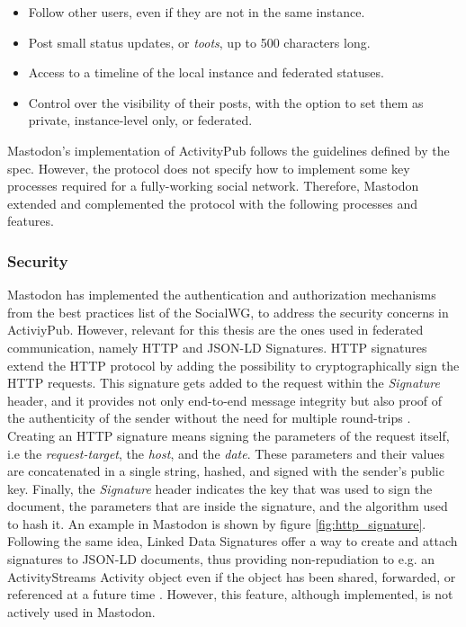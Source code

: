 \begin{itemize}
  \item Follow other users, even if they are not in the same instance. 
  \item Post small status updates, or \emph{toots}, up to 500 characters long. 
  \item Access to a timeline of the local instance and federated statuses. 
  \item Control over the visibility of their posts, with the option to set them as private, instance-level only, or federated. 
\end{itemize}

Mastodon's implementation of ActivityPub follows the guidelines defined by the spec. However, the protocol does not specify how to implement some key processes required for a fully-working social network. Therefore, Mastodon extended and complemented the protocol with the following processes and features.


\subsubsection{Security}
Mastodon has implemented the authentication and authorization mechanisms from the best practices list of the SocialWG, to address the security concerns in ActiviyPub. However,  relevant for this thesis are the ones used in federated communication, namely HTTP and JSON-LD Signatures. HTTP signatures extend the HTTP protocol by adding the possibility to cryptographically sign the HTTP requests. This signature gets added to the request within the \emph{Signature} header, and it provides not only end-to-end message integrity but also proof of the authenticity of the sender without the need for multiple round-trips \cite{cavage_sporny_2019}. Creating an HTTP signature means signing the parameters of the request itself, i.e the \emph{request-target}, the \emph{host}, and the \emph{date}. These parameters and their values are concatenated in a single string, hashed, and signed with the sender's public key. Finally, the \emph{Signature} header indicates the key that was used to sign the document, the parameters that are inside the signature, and the algorithm used to hash it. An example in Mastodon is shown by figure \ref{fig:http_signature}. 
Following the same idea, Linked Data Signatures offer a way to create and attach signatures to JSON-LD documents, thus providing non-repudiation to e.g. an ActivityStreams Activity object even if the object has been shared, forwarded, or referenced at a future time \cite{celik_prodromou_le_hors_2014}. However, this feature, although implemented, is not actively used in Mastodon.

